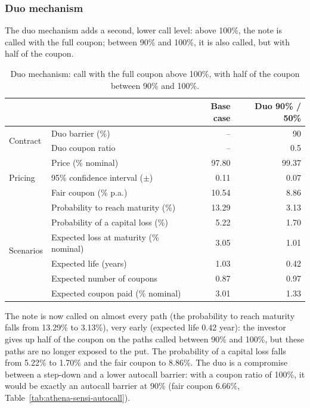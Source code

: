 \documentclass[11pt,a4paper]{article}
\begin{document}
\clearpage
\subsubsection{Duo mechanism}

The duo mechanism adds a second, lower call level: above 100\%, the note is called with the full coupon; between 90\%
and 100\%, it is also called, but with half of the coupon.

\begin{table}[htbp]
  \centering
  \small
  \begin{tabular}{llrr}
    \toprule
     & & \textbf{Base case} & \textbf{Duo 90\% / 50\%} \\
    \midrule
    \multirow{2}{*}{Contract}
      & Duo barrier (\%) & -- & 90 \\
      & Duo coupon ratio & -- & 0.5 \\
    \midrule
    \multirow{3}{*}{Pricing}
      & Price (\% nominal) & 97.80 & 99.37 \\
      & 95\% confidence interval ($\pm$) & 0.11 & 0.07 \\
      & Fair coupon (\% p.a.) & 10.54 & 8.86 \\
    \midrule
    \multirow{6}{*}{Scenarios}
      & Probability to reach maturity (\%) & 13.29 & 3.13 \\
      & Probability of a capital loss (\%) & 5.22 & 1.70 \\
      & Expected loss at maturity (\% nominal) & 3.05 & 1.01 \\
      & Expected life (years) & 1.03 & 0.42 \\
      & Expected number of coupons & 0.87 & 0.97 \\
      & Expected coupon paid (\% nominal) & 3.01 & 1.33 \\
    \bottomrule
  \end{tabular}
  \caption{Duo mechanism: call with the full coupon above 100\%, with half of the coupon between 90\% and 100\%.}
  \label{tab:athena-duo}
\end{table}

The note is now called on almost every path (the probability to reach maturity falls from 13.29\% to 3.13\%), very
early (expected life 0.42 year): the investor gives up half of the coupon on the paths called between 90\% and
100\%, but these paths are no longer exposed to the put. The probability of a capital loss falls from 5.22\% to
1.70\% and the fair coupon to 8.86\%. The duo is a compromise between a step-down and a lower autocall barrier: with
a coupon ratio of 100\%, it would be exactly an autocall barrier at 90\% (fair coupon 6.66\%,
Table~\ref{tab:athena-sensi-autocall}).
\end{document}

